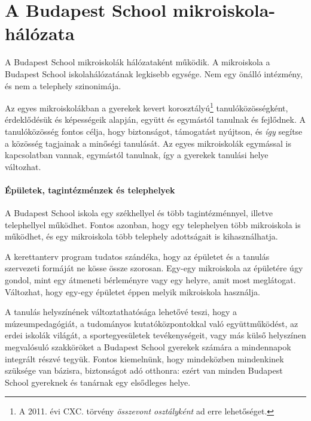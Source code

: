 \section{A Budapest School mikroiskola-hálózata}


A Budapest School mikroiskolák hálózataként működik. A mikroiskola a Budapest
School iskolahálózatának legkisebb egysége. Nem egy önálló intézmény, és nem a
telephely szinonimája.

Az egyes mikroiskolákban a gyerekek kevert korosztályú\footnote{A 2011. évi CXC. törvény
\emph{összevont osztályként} ad erre lehetőséget. } tanulóközösségként,
érdeklődésük és képességeik alapján, együtt és egymástól tanulnak és fejlődnek.
A tanulóközösség fontos célja, hogy biztonságot, támogatást nyújtson, és
\emph{így} segítse a közösség tagjainak a minőségi tanulását. Az egyes
mikroiskolák egymással is kapcsolatban vannak,
egymástól tanulnak, így a gyerekek tanulási helye változhat.

\paragraph{Épületek, tagintézménzek és telephelyek}
A Budapest School iskola egy székhellyel és több tagintézménnyel, illetve
telephellyel működhet. Fontos azonban, hogy egy telephelyen több mikroiskola is
működhet, és egy mikroiskola több telephely adottságait is kihasználhatja.

A 
\ifkerettanterv
kerettanterv
\else
program
\fi tudatos szándéka, hogy az épületet és a
tanulás szervezeti formáját ne kösse össze szorosan. Egy-egy mikroiskola az
épületére úgy gondol, mint egy átmeneti bérleményre vagy egy helyre, amit most
meglátogat.
Változhat, hogy egy-egy épületet éppen melyik mikroiskola használja.

A tanulás helyszínének változtathatósága lehetővé teszi, hogy a
múzeumpedagógiát, a tudományos kutatóközpontokkal való együttműködést, az erdei
iskolák világát, a sportegyesületek tevékenységeit, vagy más külső helyszínen
megvalósuló szakköröket a Budapest School gyerekek számára a mindennapok
integrált részvé tegyük. Fontos kiemelnünk, hogy mindeközben mindenkinek
szüksége van bázisra, biztonságot adó otthonra: ezért van minden Budapest
School gyereknek és tanárnak egy elsődleges helye.
\ifkerettanterv
